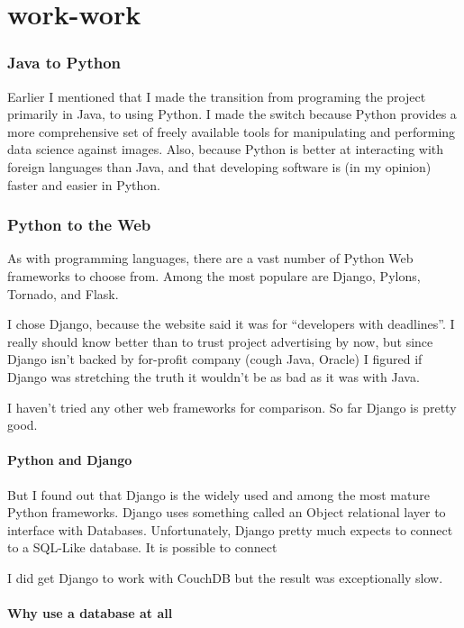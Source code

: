 \chapter{work-work}

\subsection{Java to Python}

Earlier I mentioned that I made the transition from programing the project primarily in Java, to using Python.  I made the switch because Python provides a more comprehensive set of freely available tools for manipulating and performing data science against images.  Also, because Python is better at interacting with foreign languages than Java, and that developing software is (in my opinion) faster and easier in Python.

\subsection{Python to the Web}

As with programming languages, there are a vast number of Python Web frameworks to choose from.  Among the most populare are Django, Pylons, Tornado, and Flask.

I chose Django, because the website said it was for ``developers with deadlines''.  I really should know better than to trust project advertising by now, but since Django isn't backed by for-profit company (cough Java, Oracle) I figured if Django was stretching the truth it wouldn't be as bad as it was with Java.

I haven't tried any other web frameworks for comparison.   So far Django is pretty good.


\subsubsection{Python and Django}

But I found out that Django is the widely used and among the most mature Python frameworks.  Django uses something called an Object relational layer to interface with Databases.  Unfortunately, Django pretty much expects to connect to a SQL-Like database.  It is possible to connect 

I did get Django to work with CouchDB but the result was exceptionally slow.

\subsubsection{Why use a database at all}

